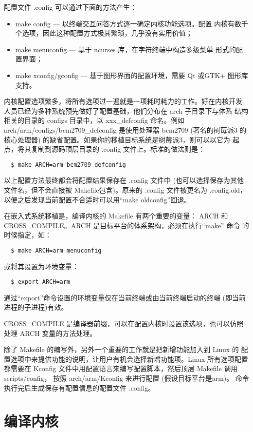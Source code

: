 配置文件 .config 可以通过下面的方法产生：
\begin{itemize}
    \item make config --- 以终端交互问答方式逐一确定内核功能选项。配置
        内核有数千个选项，因此这种配置方式极其繁琐，几乎没有实用价值；
    \item make menuconfig --- 基于 ncurses 库，在字符终端中构造多级菜单
        形式的配置界面；
    \item make xconfig/gconfig --- 基于图形界面的配置环境，需要 Qt 或GTK+
        图形库支持。
\end{itemize}
内核配置选项繁多，将所有选项过一遍就是一项耗时耗力的工作。好在内核开发
人员已经为多种系统预先做好了配置基础，他们分布在 arch 子目录下与体系
结构相关的目录的 configs 目录中，以 xxx\_defconfig 命名。例如
arch/arm/configs/bcm2709\_defconfig 是使用处理器 bcm2709 (著名的树莓派3
的核心处理器) 的缺省配置。如果你的移植目标系统是树莓派3，则可以以它为
起点，将其复制到源码顶层目录的 .config 文件上。标准的做法则是：
\begin{verbatim}
  $ make ARCH=arm bcm2709_defconfig
\end{verbatim}

以上配置方法最终都会将配置结果保存在 .config 文件中 (也可以选择保存为其他
文件名，但不会直接被 Makefile包含)。原来的 .config 文件被更名为
.config.old，以便之后发现当前配置不合适时可以用``make oldconfig''回退。

在嵌入式系统移植是，编译内核的 Makefile 有两个重要的变量：
ARCH 和 CROSS\_COMPILE。ARCH 是目标平台的体系架构，必须在执行``make'' 命令
的时候指定，如：
\begin{verbatim}
  $ make ARCH=arm menuconfig
\end{verbatim}
或将其设置为环境变量：
\begin{verbatim}
  $ export ARCH=arm
\end{verbatim}
通过``export''命令设置的环境变量仅在当前终端或由当前终端启动的终端
(即当前进程的子进程)有效。

CROSS\_COMPILE 是编译器前缀，可以在配置内核时设置该选项，也可以仿照
处理 ARCH 变量的方法处理。

除了 Makefile 的编写外，另外一个重要的工作就是把新增功能加入到 Linux 的
配置选项中来提供功能的说明，让用户有机会选择新增功能项。Linux 所有选项配置
都需要在 Kconfig 文件中用配置语言来编写配置脚本，然后顶层 Makefile 调用
scripts/config， 按照 arch/arm/Kconfig 来进行配置 (假设目标平台是arm)。
命令执行完后生成保存有配置信息的配置文件 .config。

\section{编译内核}

